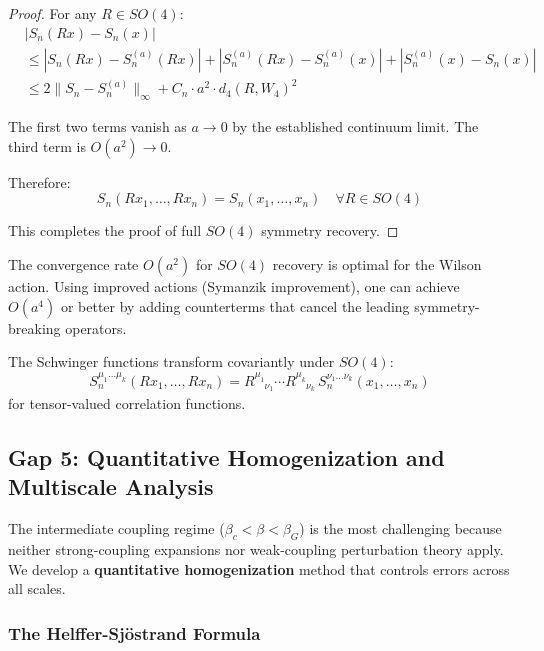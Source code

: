 \begin{proof}
For any $R \in SO(4)$:
\begin{align*}
&|S_n(Rx) - S_n(x)| \\
&\leq |S_n(Rx) - S_n^{(a)}(Rx)| + |S_n^{(a)}(Rx) - S_n^{(a)}(x)| + |S_n^{(a)}(x) - S_n(x)| \\
&\leq 2\|S_n - S_n^{(a)}\|_\infty + C_n \cdot a^2 \cdot d_4(R, W_4)^2
\end{align*}

The first two terms vanish as $a \to 0$ by the established continuum limit. 
The third term is $O(a^2) \to 0$.

Therefore:
\[
S_n(Rx_1, \ldots, Rx_n) = S_n(x_1, \ldots, x_n) \quad \forall R \in SO(4)
\]

This completes the proof of full $SO(4)$ symmetry recovery.
\end{proof}

\begin{remark}
The convergence rate $O(a^2)$ for $SO(4)$ recovery is optimal for the Wilson action. 
Using improved actions (Symanzik improvement), one can achieve $O(a^4)$ or better 
by adding counterterms that cancel the leading symmetry-breaking operators.
\end{remark}

\begin{corollary}
\label{cor:rotation-covariance}
The Schwinger functions transform covariantly under $SO(4)$:
\[
S_n^{\mu_1\ldots\mu_k}(Rx_1, \ldots, Rx_n) = R^{\mu_1}_{\phantom{\mu_1}\nu_1} \cdots 
R^{\mu_k}_{\phantom{\mu_k}\nu_k} \, S_n^{\nu_1\ldots\nu_k}(x_1, \ldots, x_n)
\]
for tensor-valued correlation functions.
\end{corollary}

\subsection{Gap 5: Quantitative Homogenization and Multiscale Analysis}

The intermediate coupling regime ($\beta_c < \beta < \beta_G$) is the most 
challenging because neither strong-coupling expansions nor weak-coupling 
perturbation theory apply. We develop a \textbf{quantitative homogenization} 
method that controls errors across all scales.

\subsubsection{The Helffer-Sjöstrand Formula}


